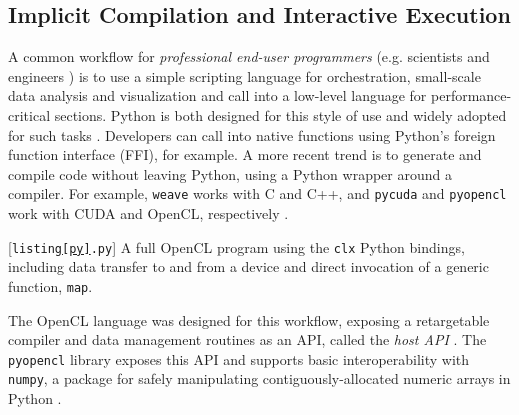 \documentclass[9pt,preprint]{sigplanconf}
\begin{document}
\subsection{Implicit Compilation and Interactive Execution}\label{compenv}\label{backend}\label{implicit}


A common workflow for \emph{professional end-user programmers} (e.g. scientists and engineers \cite{peus}) is to use a simple scripting language for orchestration, small-scale data analysis and visualization and call into a low-level language for performance-critical sections. Python is both designed for this style of use and widely adopted for such tasks \cite{sanner1999python,nguyen2010survey}. Developers can call into native functions using Python's foreign function interface (FFI), for example. A more recent trend is to generate and compile code without leaving Python, using a Python wrapper around a compiler. For example, \verb|weave| works with C and C++, and \verb|pycuda| and \verb|pyopencl| work with CUDA and OpenCL, respectively \cite{klockner2011pycuda}. 
\begin{codelisting}

\caption{[\texttt{listing\ref{py}.py}] A full OpenCL program using the \texttt{clx} Python bindings, including data transfer to and from a device and direct invocation of a generic function, \texttt{map}.}
\label{py}
\end{codelisting}
The OpenCL language was designed for this workflow, exposing a retargetable compiler and data management  routines as an API, called the \emph{host API} \cite{opencl11}. The \verb|pyopencl| library exposes this API and supports basic interoperability with \verb|numpy|, a package for safely manipulating contiguously-allocated numeric arrays in Python \cite{klockner2011pycuda}.
\end{document}
